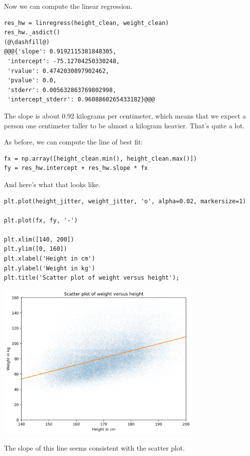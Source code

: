 Now we can compute the linear regression.

\begin{lstlisting}[]
res_hw = linregress(height_clean, weight_clean)
res_hw._asdict()
(@\dashfill@)
@@@{'slope': 0.9192115381848305,
 'intercept': -75.12704250330248,
 'rvalue': 0.4742030897902462,
 'pvalue': 0.0,
 'stderr': 0.005632863769802998,
 'intercept_stderr': 0.9608860265433182}@@@
\end{lstlisting}

The slope is about 0.92 kilograms per centimeter, which means that we
expect a person one centimeter taller to be almost a kilogram heavier.
That's quite a lot.

As before, we can compute the line of best fit:

\begin{lstlisting}[]
fx = np.array([height_clean.min(), height_clean.max()])
fy = res_hw.intercept + res_hw.slope * fx
\end{lstlisting}

And here's what that looks like.

\begin{lstlisting}[]
plt.plot(height_jitter, weight_jitter, 'o', alpha=0.02, markersize=1)

plt.plot(fx, fy, '-')

plt.xlim([140, 200])
plt.ylim([0, 160])
plt.xlabel('Height in cm')
plt.ylabel('Weight in kg')
plt.title('Scatter plot of weight versus height');
\end{lstlisting}

\begin{center}
\includegraphics[width=4in]{chapters/09_relationships_files/09_relationships_100_0.png}
\end{center}

The slope of this line seems consistent with the scatter plot.

